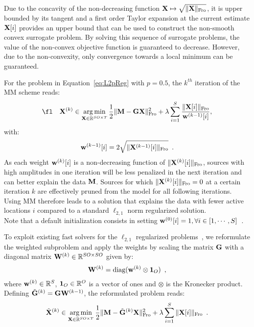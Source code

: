 Due to the concavity of the non-decreasing function $\mathbf{X}\mapsto\sqrt{\|{\mathbf{X}}\|_{\rm Fro}}$, it is upper bounded by its tangent and a first order Taylor expansion at the current estimate $\mathbf{X}{[i]}$ provides an upper bound that can be used to construct the non-smooth convex surrogate problem. By solving this sequence of surrogate problems, the value of the non-convex objective function is guaranteed to decrease. However, due to the non-convexity, only convergence towards a local minimum can be guaranteed.

For the problem in Equation~\eqref{eq:L2pReg} with $p=0.5$, the $k^{th}$ iteration of the MM scheme reads:
\begin{equation}
\label{eq:MM}
\fl \quad \bfX^{(k)} \in \argmin_{\bfX\in\R^{SO \times T}} \frac{1}{2} \fronormsq{\bfM - \bfG \bfX}  + \lambda \sum_{i=1}^S \frac{ \fronorm{\bfX{[i]}} }{ \bfw^{(k-1)}[i]},
\end{equation}
with:
\begin{equation*}
\mathbf{w}^{(k-1)}[i] = 2 \sqrt{\|{\mathbf{X}^{(k-1)}[i]}\|_{\rm Fro}} \enspace.
\end{equation*}
As each weight $\mathbf{w}^{(k)}[i]$ is a non-decreasing function of $\|{\mathbf{X}^{(k)}[i]}\|_{\rm Fro}$, sources with high amplitudes in one iteration will be less penalized in the next iteration and can better explain the data $\mathbf{M}$. Sources for which $\|{\mathbf{X}^{(k)}[i]}\|_{\rm Fro} = 0$ at a certain iteration $k$ are effectively pruned from the model for all following iterations. Using MM therefore leads to a solution that explains the data with fewer active locations $i$ compared to a standard $\ell_{2,1}$ norm regularized solution.\\
Note that a default initialization consists in setting $\mathbf{w}^{(0)}[i]=1, \forall i \in [1,\cdots, S]$~\cite{strohmeier-etal:16}.

To exploit existing fast solvers for the $\ell_{2,1}$ regularized problems~\cite{strohmeier-etal:16,Ndiaye_Fercoq_Gramfort_Salmon15}, we reformulate the weighted subproblem and apply the weights by scaling the matrix $\mathbf{G}$ with a diagonal matrix $\mathbf{W}^{(k)} \in \mathbb{R}^{SO \times SO}$ given by:
\begin{eqnarray} \label{eq:weights}
\mathbf{W}^{(k)} = \mathrm{diag}(\mathbf{w}^{(k)} \otimes \mathbf{1}_{O}) \enspace ,
\end{eqnarray}
where $\mathbf{w}^{(k)} \in \mathbb{R}^{S}$, $\mathbf{1}_{O}\in\mathbb{R}^O$ is a vector of ones and $\otimes$ is the Kronecker product.
Defining $\tilde{\mathbf{G}}^{(k)}=\mathbf{G} \mathbf{W}^{(k-1)}$, the reformulated problem reads:
\begin{eqnarray}\label{eq:lasso_new_gram}
\tilde{\mathbf{X}}^{(k)} \in \mathop{\mathrm{arg}\,\mathrm{min}}_{\mathbf{X}\in\mathbb{R}^{SO \times T}} \frac{1}{2}\|{\mathbf{M} - \tilde{\mathbf{G}}^{(k)} \mathbf{X}}\|_{\rm Fro}^2  + \lambda \sum_{i=1}^S \|{\mathbf{X}[i]}\|_{\rm Fro} \enspace .
\end{eqnarray}

